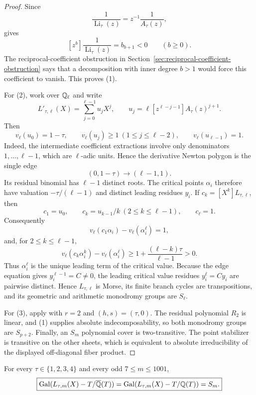 \begin{proof}
Since
\[
\frac1{\operatorname{Li}_\tau(z)}
=z^{-1}\frac1{A_\tau(z)},
\]
 gives
\[
[z^b]\frac1{\operatorname{Li}_\tau(z)}=b_{b+1}<0
\qquad(b\ge0).
\]
The reciprocal-coefficient obstruction in
Section~\ref{sec:reciprocal-coefficient-obstruction} says that a decomposition
with inner degree $b>1$ would force this coefficient to vanish. This proves
(1).

For (2), work over $\mathbb Q_\ell$ and write
\[
L'_{\tau,\ell}(X)=\sum_{j=0}^{\ell-1}u_jX^j,
\qquad
u_j=\ell[z^{\ell-j-1}]A_\tau(z)^{j+1}.
\]
Then
\[
v_\ell(u_0)=1-\tau,
\qquad v_\ell(u_j)\ge1\ (1\le j\le\ell-2),
\qquad v_\ell(u_{\ell-1})=1.
\]
Indeed, the intermediate coefficient extractions involve only denominators
$1,\ldots,\ell-1$, which are $\ell$-adic units. Hence the derivative Newton
polygon is the single edge
\[
(0,1-\tau)\longrightarrow(\ell-1,1).
\]
Its residual binomial has $\ell-1$ distinct roots. The critical points
$\alpha_i$ therefore have valuation $-\tau/(\ell-1)$ and distinct leading
residues $y_i$. If $c_k=[X^k]L_{\tau,\ell}$, then
\[
c_1=u_0,\qquad c_k=u_{k-1}/k\ (2\le k\le\ell-1),
\qquad c_\ell=1.
\]
Consequently
\[
v_\ell(c_1\alpha_i)-v_\ell(\alpha_i^\ell)=1,
\]
and, for $2\le k\le\ell-1$,
\[
v_\ell(c_k\alpha_i^k)-v_\ell(\alpha_i^\ell)
\ge1+\frac{(\ell-k)\tau}{\ell-1}>0.
\]
Thus $\alpha_i^\ell$ is the unique leading term of the critical value.
Because the edge equation gives $y_i^{\ell-1}=C\ne0$, the leading critical
value residues $y_i^\ell=Cy_i$ are pairwise distinct. Hence
$L_{\tau,\ell}$ is Morse, its finite branch cycles are transpositions, and
its geometric and arithmetic monodromy groups are $S_\ell$.

For (3), apply  with $r=2$ and $(h,s)=(\tau,0)$.
The residual polynomial $R_2$ is linear, and (1) supplies absolute
indecomposability, so both monodromy groups are $S_{p+2}$. Finally, an
$S_m$ polynomial cover is two-transitive. The point stabilizer is transitive
on the other sheets, which is equivalent to absolute irreducibility of the
displayed off-diagonal fiber product.
\end{proof}

\begin{corollary}
\label{cor:polylog-window}
For every $\tau\in\{1,2,3,4\}$ and every odd $7\le m\le1001$,
\begin{equation}
\boxed{
\operatorname{Gal}(L_{\tau,m}(X)-T/\overline{\mathbb Q}(T))
=\operatorname{Gal}(L_{\tau,m}(X)-T/\mathbb Q(T))=S_m.}
\label{eq:polylog-window}
\end{equation}
\end{corollary}

